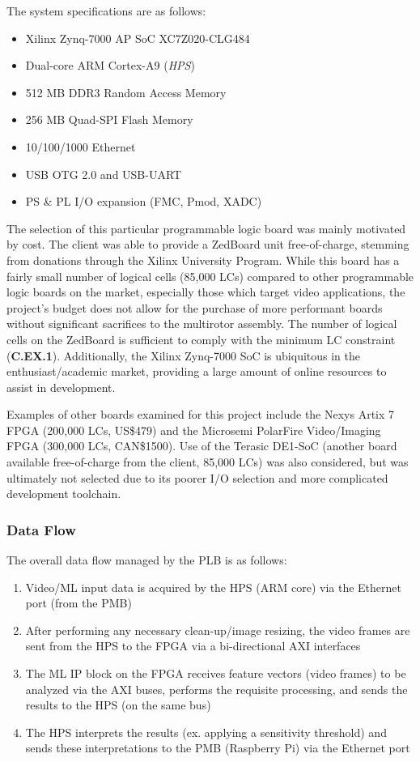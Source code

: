 The system specifications are as follows\cite{zedboard}:
\begin{itemize}
\item Xilinx Zynq-7000 AP SoC XC7Z020-CLG484
\item Dual-core ARM Cortex-A9 (\textit{HPS})
\item 512 MB DDR3 Random Access Memory
\item 256 MB Quad-SPI Flash Memory
\item 10/100/1000 Ethernet 
\item USB OTG 2.0 and USB-UART 
\item PS \& PL I/O expansion (FMC, Pmod, XADC)
\end{itemize}

The selection of this particular programmable logic board was mainly motivated by cost. The client was able to provide a ZedBoard unit free-of-charge, stemming from donations through the Xilinx University Program. While this board has a fairly small number of logical cells (85,000 LCs) compared to other programmable logic boards on the market, especially those which target video applications, the project's budget does not allow for the purchase of more performant boards without significant sacrifices to the multirotor assembly. The number of logical cells on the ZedBoard is sufficient to comply with the minimum LC constraint (\textbf{C.EX.1}). Additionally, the Xilinx Zynq-7000 SoC is ubiquitous in the enthusiast/academic market, providing a large amount of online resources to assist in development.

Examples of other boards examined for this project include the Nexys Artix 7 FPGA (200,000 LCs, US\$479)\cite{nexys} and the Microsemi PolarFire Video/Imaging FPGA (300,000 LCs, CAN\$1500)\cite{microsemi}. Use of the Terasic DE1-SoC (another board available free-of-charge from the client, 85,000 LCs) was also considered, but was ultimately not selected due to its poorer I/O selection and more complicated development toolchain.

\subsubsection{Data Flow}
The overall data flow managed by the PLB is as follows:
\begin{enumerate}
\item Video/ML input data is acquired by the HPS (ARM core) via the Ethernet port (from the PMB)
\item After performing any necessary clean-up/image resizing, the video frames are sent from the HPS to the FPGA via a bi-directional AXI interfaces
\item The ML IP block on the FPGA receives feature vectors (video frames) to be analyzed via the AXI buses, performs the requisite processing, and sends the results to the HPS (on the same bus)
\item The HPS interprets the results (ex. applying a sensitivity threshold) and sends these interpretations to the PMB (Raspberry Pi) via the Ethernet port
\end{enumerate}

